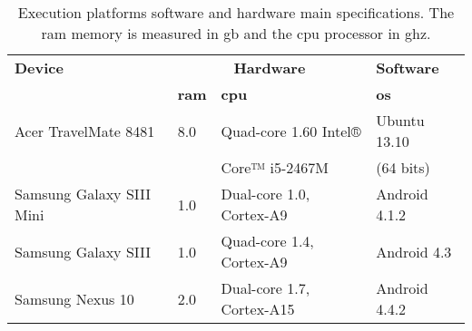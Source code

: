 \begin{table}[H]
 \caption{Execution platforms software and hardware main specifications. The \ac{ram}
 memory is measured in \ac{gb} and the \ac{cpu} processor in \ac{ghz}.}
 \label{tbl:devices_specs}
 \footnotesize
 \centering
\begin{tabular}{l l l l}
  \hline 
 \textbf{Device} 		& \multicolumn{2}{c}{\textbf{Hardware}} 	
& \textbf{Software}	\\
				& \textbf{\ac{ram}} & \textbf{\ac{cpu}} 			
& \textbf{\ac{os}} 		\\
    \hline 
  Acer TravelMate 8481  	& 8.0	& Quad-core 1.60 Intel® 	 	
& Ubuntu 13.10 		\\
				& 	& Core™ i5-2467M			
& (64 bits)		\\
  Samsung Galaxy SIII Mini	& 1.0 	& Dual-core 1.0, Cortex-A9	 	
& Android 4.1.2 	\\
  Samsung Galaxy SIII 		& 1.0 	& Quad-core 1.4, Cortex-A9 		
& Android 4.3   	\\
  Samsung Nexus 10 		& 2.0 	& Dual-core 1.7, Cortex-A15 		
& Android 4.4.2 	\\
\hline
\end{tabular}
\end{table}